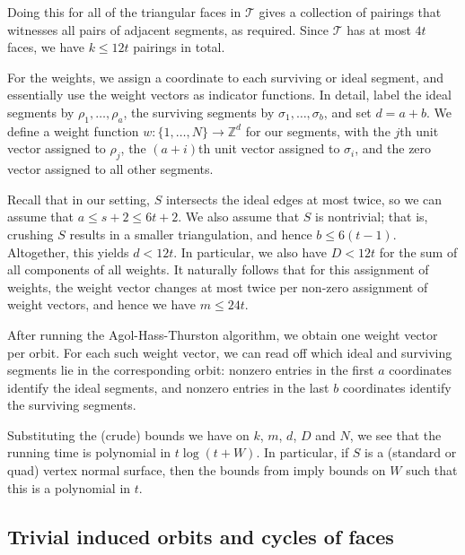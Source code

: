 \documentclass[a4paper,UKenglish,cleveref, autoref, thm-restate]{lipics-v2021}
\newcommand{\tri}{\mathcal{T}}
\begin{document}
Doing this for all of the triangular faces in $\tri$ gives a collection of pairings that witnesses all pairs of adjacent segments, as required.
Since $\tri$ has at most $4t$ faces, we have $k \leqslant 12t$ pairings in total.

For the weights, we assign a coordinate to each surviving or ideal segment, and essentially use the weight vectors as indicator functions.
In detail, label the ideal segments by $\rho_1,\ldots,\rho_{a}$, the surviving segments by $\sigma_1,\ldots,\sigma_{b}$, and set $d = a + b$.
We define a weight function $w: \{ 1, \ldots , N\} \to \mathbb{Z}^d$ for our segments, with the $j$th unit vector assigned to $\rho_j$, the $(a+i)$th unit vector assigned to $\sigma_i$, and the zero vector assigned to all other segments.

Recall that in our setting, $S$ intersects the ideal edges at most twice, so we can assume that $a \leqslant s + 2 \leqslant 6t + 2$.
We also assume that $S$ is nontrivial;
that is, crushing $S$ results in a smaller triangulation, and hence $b \leqslant 6(t-1)$.
Altogether, this yields $d < 12t$. In particular, we also have $D < 12t$ for the sum of all components of all weights.
It naturally follows that for this assignment of weights, the weight vector changes at most twice per non-zero assignment of weight vectors, and hence we have $m \leqslant 24t$.

After running the Agol-Hass-Thurston algorithm, we obtain one weight vector per orbit.
For each such weight vector, we can read off which ideal and surviving segments lie in the corresponding orbit:
nonzero entries in the first $a$ coordinates identify the ideal segments, and nonzero entries in the last $b$ coordinates identify the surviving segments.

Substituting the (crude) bounds we have on $k$, $m$, $d$, $D$ and $N$, we see that the running time is polynomial in $t\log(t+W)$. In particular, if $S$ is a (standard or quad) vertex normal surface, then the bounds from \cite{hass1999computational} imply bounds on $W$ such that this is a polynomial in $t$.

\subsection{Trivial induced orbits and cycles of faces}\label{ssec:trivialInducedOrbit}
\end{document}
